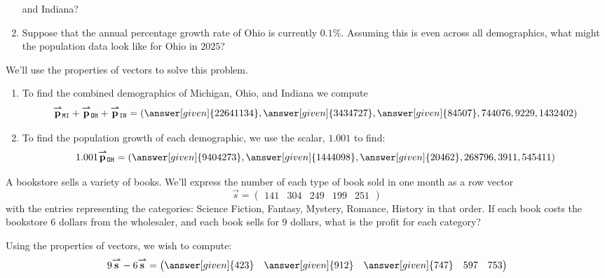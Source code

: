 \documentclass{ximera}
\begin{document}
\begin{example}
\begin{enumerate}
  and Indiana?
\item Suppose that the annual percentage growth rate of Ohio is
  currently $0.1\%$. Assuming this is even across all demographics,
  what might the population data look like for Ohio in $2025$?
\end{enumerate}
\begin{explanation}
  We'll use the properties of vectors to solve this problem.
  \begin{enumerate}
  \item To find the combined demographics of Michigan, Ohio, and
    Indiana we compute
    \[
    \vec{p}_{\texttt{MI}} + \vec{p}_{\texttt{OH}} + \vec{p}_{\texttt{IN}} = \left(\answer[given]{22641134},\answer[given]{3434727},\answer[given]{84507},744076,9229,1432402\right)
    \]
  \item To find the population growth of each demographic, we use the scalar, $1.001$ to find:
    \[
    1.001 \vec{p}_{\texttt{OH}} =\left(\answer[given]{9404273},\answer[given]{1444098},\answer[given]{20462},268796,3911,545411 \right)
    \]
  \end{enumerate}
\end{explanation}
\end{example}



\begin{example}
  A bookstore sells a variety of books. We'll express the number of
  each type of book sold in one month as a row vector
  \[
  \vec{s} = \begin{pmatrix}141 & 304 & 249 & 199 & 251 \end{pmatrix}
  \]
  with the entries representing the categories: Science Fiction,
  Fantasy, Mystery, Romance, History in that order.  If each book
  costs the bookstore $6$ dollars from the wholesaler, and each book sells
  for $9$ dollars, what is the profit for each category?
  \begin{explanation}
    Using the properties of vectors, we wish to compute:
    \[
    9\vec{s}-6\vec{s} = \begin{pmatrix} \answer[given]{423} & \answer[given]{912} & \answer[given]{747} & 597 & 753 \end{pmatrix}
    \]
  \end{explanation}
\end{example}
\end{document}
